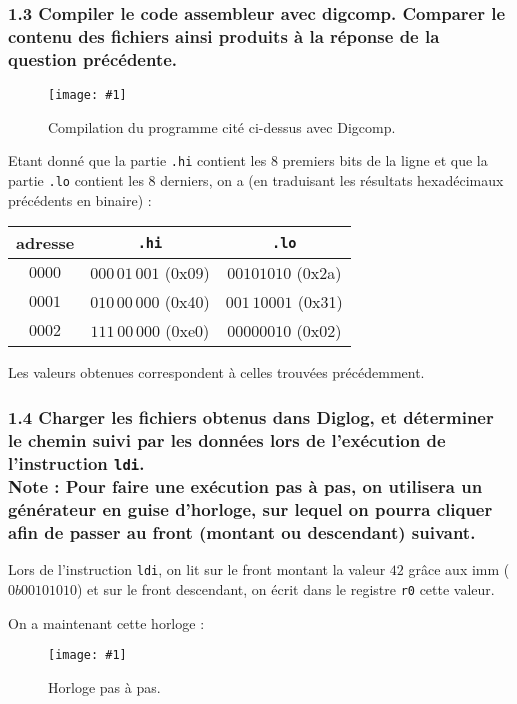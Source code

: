 \documentclass[twoside, 12pt, a4paper]{article}
\newcommand{\cf}[3]{
    \begin{figure}[!hbt]
        \centering
        \texttt{[image: \#1]}
    \caption{#3}\label{Fig:#1}
    \end{figure}
}
\newcommand{\hcf}[2]{\cf{#1}{.75}{#2}}
\begin{document}
        \subsubsection*{\textbf{1.3} Compiler le code assembleur avec digcomp. Comparer le contenu des fichiers ainsi produits
à la réponse de la question précédente.}

    \hcf{compil_addi.png}{Compilation du programme cité ci-dessus avec Digcomp.}


    Etant donné que la partie \texttt{.hi} contient les 8 premiers bits de la ligne et que la partie \texttt{.lo} contient les 8 derniers, on a (en traduisant les résultats hexadécimaux précédents en binaire) :
    \begin{center}
        \begin{tabular}{|c|c|c|}
            \hline
            adresse & \texttt{.hi} & \texttt{.lo} \\
            \hline
             $0000$ & $000\,01\,001$ (0x09) & $00101010$ (0x2a)\\
             $0001$ & $010\,00\,000$ (0x40) & $001\,10001$ (0x31)\\
             $0002$ & $111\,00\,000$ (0xe0) & $00000010$ (0x02)\\ 
             \hline
        \end{tabular}
    \end{center}

    Les valeurs obtenues correspondent à celles trouvées précédemment.

        \subsubsection*{\textbf{1.4} Charger les fichiers obtenus dans Diglog, et déterminer le chemin suivi par les données lors de l’exécution de l’instruction \texttt{ldi}. \\
        \textbf{Note :} Pour faire une exécution pas à pas, on utilisera un générateur en guise d'horloge, sur lequel on pourra cliquer afin de passer au front (montant ou descendant) suivant.}

Lors de l'instruction \texttt{ldi}, on lit sur le front montant la valeur $42$ grâce aux imm ($0b00101010$) et sur le front descendant, on écrit dans le registre \texttt{r0} cette valeur. 

On a maintenant cette horloge :
    \hcf{clock.png}{Horloge pas à pas.}
\end{document}
